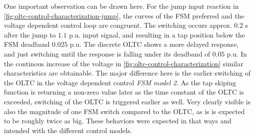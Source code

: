 One important observation can be drawn here.
For the jump input reaction in \autoref{fig:oltc-control-characterization-jump}, the curves of the \acs{FSM} preferred and the voltage dependent control loop are congruent.
The switching occurs approx. $0.2$ s after the jump to $1.1$ p.u. input signal, and resulting in a tap position below the \acs{FSM} deadband $0.025$ p.u.
The discrete \acs{OLTC} shows a more delayed response, and just switching until the response is falling under its deadband of $0.05$ p.u.
In the continous increase of the voltage in \autoref{fig:oltc-control-characterization} similar characteristics are obtainable.
The major difference here is the earlier switching of the \acs{OLTC} in the voltage dependent control \textit{FSM model 2}.
As the tap skiping function is returning a non-zero value later as the time constant of the \acs{OLTC} is exceeded, switching of the \acs{OLTC} is triggered earlier as well.
Very clearly visible is also the magnitude of one \acs{FSM} switch compared to the \acs{OLTC}, as is is expected to be roughly twice as big.
These behaviors were expected in that ways and intended with the different control models.





